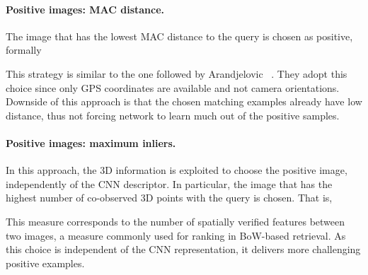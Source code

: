 \documentclass[runningheads]{llncs}
\begin{document}
\paragraph{Positive images: MAC distance.} 
The image that has the lowest MAC distance to the query is chosen as positive, formally
 
This strategy is similar to the one followed by Arandjelovic \etal~\cite{AGTPS15}. 
They adopt this choice since only GPS coordinates are available and not camera orientations.
Downside of this approach is that the chosen matching examples already have low distance, thus not forcing network to learn much out of the positive samples.


\paragraph{Positive images: maximum inliers.} 
In this approach, the 3D information is exploited to choose the positive image, independently of the CNN descriptor. In particular, the image that has the highest number of co-observed 3D points with the query is chosen.
That is, 
 
This measure corresponds to the number of spatially verified features between two images, a measure commonly used for ranking in BoW-based retrieval. As this choice is independent of the CNN representation, it delivers more challenging positive examples.
\end{document}
